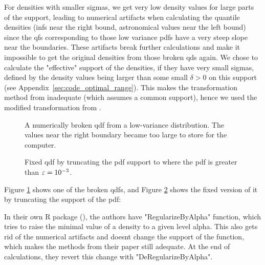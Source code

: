 For densities with smaller sigmas, we get very low density values for large parts of the
support, leading to numerical artifacts when calculating the quantile densities (infs
near the right bound, astronomical values near the left bound) since the qfs corresponding to
those low variance pdfs have a very steep slope near the boundaries. These artifacts
break further calculations and make it impossible to get the original densities from those broken qds
again. We chose to calculate the "effective" support of the densities, if they have very
small sigmas, defined by the density values being larger than some small $\delta > 0$ on
this support (see Appendix~\ref{sec:code_optimal_range}). This makes the transformation
method from \textcite{PetersenMüller2016} inadequate (which assumes a common support),
hence we used the modified transformation from \textcite{KokoszkaEtAl2019}.

\begin{figure}[h]
    \centering
    \resizebox{0.9\textwidth}{!}{}
    \caption[Example of broken qdf]{A numerically broken qdf from a low-variance distribution.
    The values near the right boundary became too large to store for the computer.}
    \label{fig:broken_qdf}
\end{figure}

\begin{figure}[h]
    \centering
    \resizebox{0.9\textwidth}{!}{}
    \caption[Example of fixed qdf]{Fixed qdf by truncating the pdf support to where
    the pdf is greater than $\varepsilon = \nobreak 10^{-3}$.}
    \label{fig:fixed_qdf}
\end{figure}

Figure \ref{fig:broken_qdf} shows one of the broken qdfs, and Figure \ref{fig:fixed_qdf}
shows the fixed version of it by truncating the support of the pdf:

In their own R package (), the authors have "RegularizeByAlpha"
function, which tries to raise the minimal value of a density to a given level alpha. This
also gets rid of the numerical artifacts and doesnt change the support of the function,
which makes the methods from their paper still adequate. At the end of calculations, they
revert this change with "DeRegularizeByAlpha".